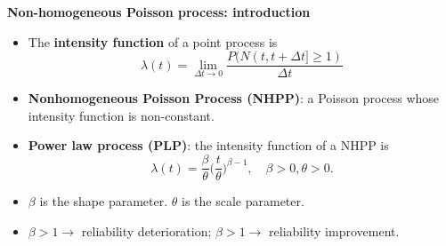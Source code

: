 \begin{frame}{\textbf{Non-homogeneous Poisson process: introduction}}
\begin{itemize}
    \item The \textbf{intensity function} of a point process is $$\lambda(t) = \lim_{\Delta t \rightarrow 0}\frac{P(N(t, t+\Delta t] \geq 1)}{\Delta t}$$
    \item \textbf{Nonhomogeneous Poisson Process (NHPP)}: a Poisson process whose intensity function is non-constant.
    \item \textbf{Power law process (PLP)}: the intensity function of a NHPP is $$\lambda(t) = \frac{\beta}{\theta}\bigg(\frac{t}{\theta}\bigg)^{\beta-1}, \quad \beta > 0, \theta > 0.$$
    \item $\beta$ is the shape parameter.  $\theta$ is the scale parameter.
    \item $\beta > 1 \rightarrow$ reliability deterioration; $\beta > 1 \rightarrow$ reliability improvement.
\end{itemize}
\end{frame}

